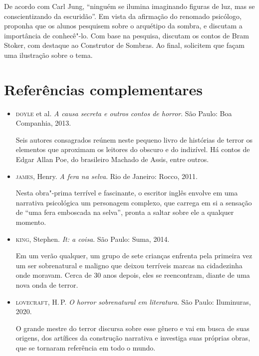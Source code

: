 \documentclass[12pt]{extarticle}
\begin{document}
De acordo com Carl Jung, ``ninguém se ilumina imaginando figuras de
luz, mas se conscientizando da escuridão''. Em vista da afirmação do
renomado psicólogo, proponha que os alunos pesquisem sobre o arquétipo
da sombra, e discutam a importância de conhecê"-lo. Com base na
pesquisa, discutam os contos de Bram Stoker, com destaque ao
Construtor de Sombras. Ao final, solicitem que façam uma ilustração
sobre o tema.


\section{Referências complementares}

\begin{itemize}
\item\textsc{doyle} et al. \textit{A causa secreta e outros contos de horror}. São
Paulo: Boa Companhia, 2013.

Seis autores consagrados reúnem neste pequeno livro de histórias de
terror os elementos que aproximam os leitores do obscuro e do indizível.
Há contos de Edgar Allan Poe, do brasileiro Machado de Assis, entre
outros.

\item\textsc{james}, Henry. \textit{A fera na selva}. Rio de Janeiro: Rocco, 2011.

Nesta obra"-prima terrível e fascinante, o escritor inglês envolve em uma
narrativa psicológica um personagem complexo, que carrega em si a
sensação de ``uma fera emboscada na selva'', pronta a saltar sobre ele a
qualquer momento.

\item\textsc{king}, Stephen. \textit{It: a coisa}. São Paulo: Suma, 2014.

Em um verão qualquer, um grupo de sete crianças enfrenta pela primeira
vez um ser sobrenatural e maligno que deixou terríveis marcas na
cidadezinha onde moravam. Cerca de 30 anos depois, eles se reencontram,
diante de uma nova onda de terror.

\item\textsc{lovecraft}, H.\,P. \textit{O horror sobrenatural em literatura}. São Paulo: Iluminuras, 2020.

O grande mestre do terror discursa sobre esse gênero e vai em busca de
suas origens, dos artífices da construção narrativa e investiga suas
próprias obras, que se tornaram referência em todo o mundo.
\end{itemize}
\end{document}
